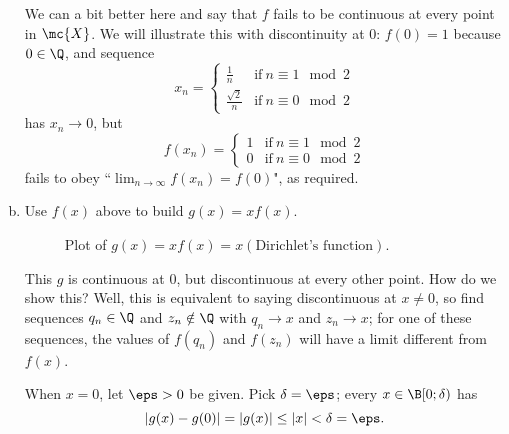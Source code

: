 \begin{example}
\begin{enumerate}[(a)]
			\smallskip
			
			We can a bit better here and say that \(f\) fails to be continuous at every point in \(\mc{X}\). We will illustrate this with discontinuity at \(0\): \(f(0)=1\) because \(0\in\Q\), and sequence 
			\begin{equation*}
				x_n=\begin{cases}
						\frac{1}{n}&\text{if}~n\equiv 1\mod 2\\
						
						\frac{\sqrt{2}}{n}&\text{if}~n\equiv 0\mod 2
				    \end{cases}
			\end{equation*}
			has \(x_n\to 0\), but 
			\begin{equation*}
				f(x_n)=\begin{cases}
						1&\text{if}~n\equiv 1\mod 2\\
						0&\text{if}~n\equiv 0\mod 2
					   \end{cases}
			\end{equation*}
			fails to obey ``\(\displaystyle\lim_{n\to\infty}f(x_n)=f(0)\)", as required.
			
			\item Use \(f(x)\) above to build \(g(x)=xf(x)\).
			\begin{figure}[H]
				\centering
				\caption{Plot of \(g(x)=xf(x)=x(\text{Dirichlet's function})\).}
			\end{figure}
			This \(g\) is continuous at \(0\), but discontinuous at every other point. How do we show this? Well, this is equivalent to saying discontinuous at \(x\neq 0\), so find sequences \(q_n\in\Q\) and \(z_n\notin\Q\) with \(q_n\to x\) and \(z_n\to x\); for one of these sequences, the values of \(f(q_n)\) and \(f(z_n)\) will have a limit different from \(f(x)\).
			
			\medskip
			
			When \(x=0\), let \(\eps>0\) be given. Pick \(\delta=\eps\); every \(x\in\B[0;\delta)\) has 
			\begin{equation*}
				\left|g(x)-g(0)\right|=|g(x)|\leq |x|<\delta=\eps.
			\end{equation*}
	\end{enumerate}
\end{example}

